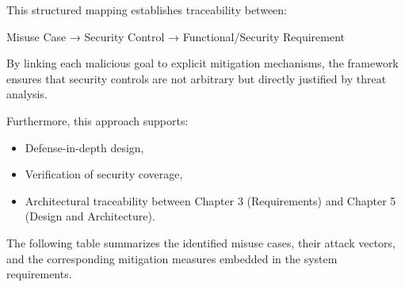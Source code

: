 \documentclass[12pt,a4paper]{report}
\begin{document}
This structured mapping establishes traceability between:


Misuse Case → Security Control → Functional/Security Requirement


By linking each malicious goal to explicit mitigation mechanisms, the framework ensures that security controls are not arbitrary but directly justified by threat analysis.


Furthermore, this approach supports:
\begin{itemize}
\item Defense-in-depth design,
\item Verification of security coverage,
\item Architectural traceability between Chapter 3 (Requirements) and Chapter 5 (Design and Architecture).
\end{itemize}


The following table summarizes the identified misuse cases, their attack vectors, and the corresponding mitigation measures embedded in the system requirements.
\end{document}
